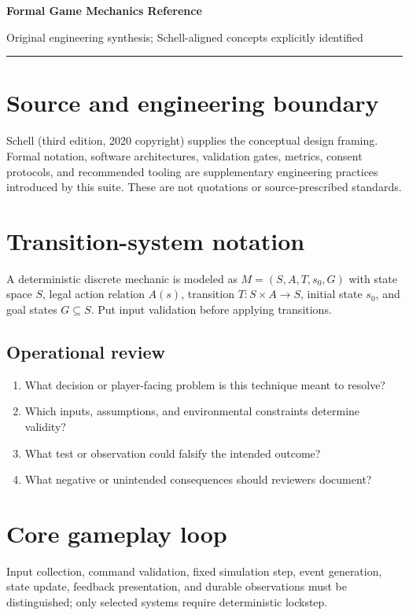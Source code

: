 \documentclass[11pt]{article}
\begin{document}
{\huge\bfseries\color{suiteblue} Formal Game Mechanics Reference}\par
\vspace{0.15in}
{\normalsize\color{suitegray} Original engineering synthesis; Schell-aligned concepts explicitly identified}\par
\vspace{0.15in}\hrule\vspace{0.15in}

\section{Source and engineering boundary}
Schell (third edition, 2020 copyright) supplies the conceptual design framing. Formal notation, software architectures, validation gates, metrics, consent protocols, and recommended tooling are supplementary engineering practices introduced by this suite. These are not quotations or source-prescribed standards.


\section{Transition-system notation}
A deterministic discrete mechanic is modeled as $M=(S,A,T,s_0,G)$ with state space $S$, legal action relation $A(s)$, transition $T:S\times A\rightarrow S$, initial state $s_0$, and goal states $G\subseteq S$. Put input validation before applying transitions.


\subsection{Operational review}
\begin{enumerate}
\item What decision or player-facing problem is this technique meant to resolve?
\item Which inputs, assumptions, and environmental constraints determine validity?
\item What test or observation could falsify the intended outcome?
\item What negative or unintended consequences should reviewers document?
\end{enumerate}

\section{Core gameplay loop}
Input collection, command validation, fixed simulation step, event generation, state update, feedback presentation, and durable observations must be distinguished; only selected systems require deterministic lockstep.
\end{document}
